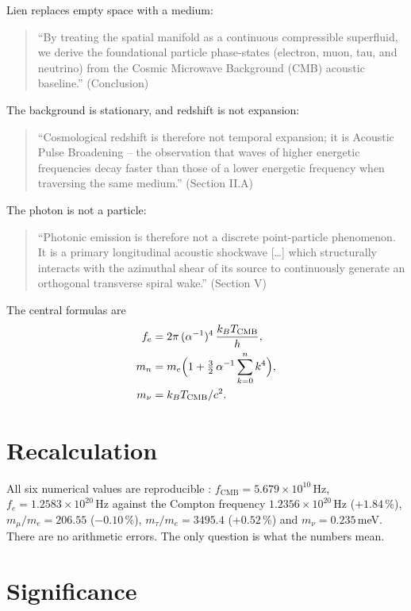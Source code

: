 Lien replaces empty space with a medium:
\begin{quote}\QM
\enquote{By treating the spatial manifold as a continuous compressible
superfluid, we derive the foundational particle phase-states (electron, muon,
tau, and neutrino) from the Cosmic Microwave Background (CMB) acoustic
baseline.} (Conclusion)
\end{quote}
The background is stationary, and redshift is not expansion:
\begin{quote}\QM
\enquote{Cosmological redshift is therefore not temporal expansion; it is
Acoustic Pulse Broadening -- the observation that waves of higher energetic
frequencies decay faster than those of a lower energetic frequency when
traversing the same medium.} (Section II.A)
\end{quote}
The photon is not a particle:
\begin{quote}\QM
\enquote{Photonic emission is therefore not a discrete point-particle
phenomenon. It is a primary longitudinal acoustic shockwave [\ldots] which
structurally interacts with the azimuthal shear of its source to continuously
generate an orthogonal transverse spiral wake.} (Section V)
\end{quote}
The central formulas are
\begin{align}
f_e &= 2\pi\,(\alpha^{-1})^4\,\frac{k_BT_\text{CMB}}{h}, \label{eq:lien-fe}\\
m_n &= m_e\Bigl(1+\tfrac{3}{2}\,\alpha^{-1}\sum_{k=0}^{n}k^4\Bigr), \label{eq:lien-mn}\\
m_\nu &= k_BT_\text{CMB}/c^2. \label{eq:lien-mnu}
\end{align}

\section{Recalculation}

All six numerical values are reproducible \KM:
$f_\text{CMB}=5.679\times10^{10}$\,Hz, $f_e=1.2583\times10^{20}$\,Hz
against the Compton frequency $1.2356\times10^{20}$\,Hz ($+1.84\,\%$),
$m_\mu/m_e=206.55$ ($-0.10\,\%$), $m_\tau/m_e=3495.4$ ($+0.52\,\%$) and
$m_\nu=0.235$\,meV. There are no arithmetic errors. The only question is
what the numbers mean.

\section{Significance}


